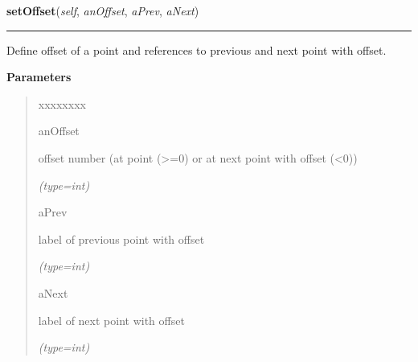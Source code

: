 \hspace{.8\funcindent}\begin{boxedminipage}{\funcwidth}

    \raggedright \textbf{setOffset}(\textit{self}, \textit{anOffset}, \textit{aPrev}, \textit{aNext})

    \vspace{-1.5ex}

    \rule{\textwidth}{0.5\fboxrule}
\setlength{\parskip}{2ex}
    Define offset of a point and references to previous and next point with
    offset.

\setlength{\parskip}{1ex}
      \textbf{Parameters}
      \vspace{-1ex}

      \begin{quote}
        \begin{Ventry}{xxxxxxxx}

          \item[anOffset]

          offset number (at point ({\textgreater}=0) or at next point with 
          offset ({\textless}0))

            {\it (type=int)}

          \item[aPrev]

          label of previous point with offset

            {\it (type=int)}

          \item[aNext]

          label of next point with offset

            {\it (type=int)}

        \end{Ventry}

      \end{quote}

    \end{boxedminipage}

    \label{gblfit:GblPoint:getOffset}

    \vspace{0.5ex}

